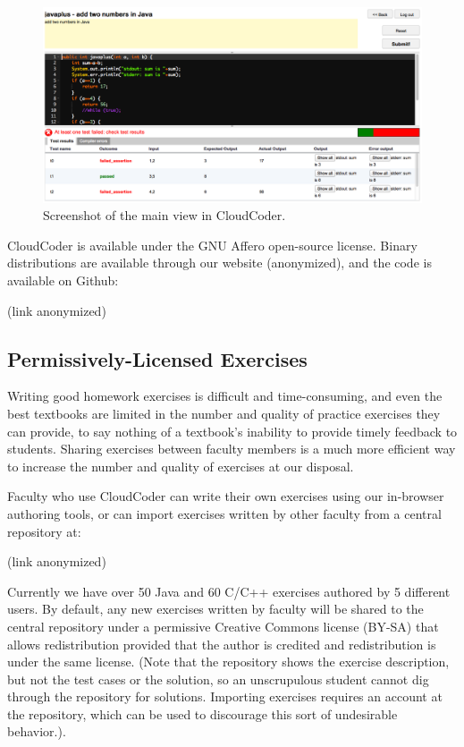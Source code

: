\documentclass{sig-alternate}
\begin{document}
\begin{figure}[ht]
\centering
\includegraphics[width=180mm]{images/screenshot.png}
\caption{Screenshot of the main view in CloudCoder.}
\label{screenshot}
\end{figure}

CloudCoder is available under the GNU Affero open-source license.
Binary distributions are available through our website (anonymized),
and the code is available on Github:

\vspace*{3mm} 
(link anonymized)
\vspace*{3mm}


\subsection{Permissively-Licensed Exercises}

Writing good homework exercises is difficult and
time-consuming, and even the best textbooks are limited in the
number and quality of practice exercises they can provide, to say
nothing of a textbook's inability to provide timely feedback to
students.
Sharing exercises between faculty members is a much
more efficient way to increase the number and quality of exercises at
our disposal.

Faculty who use CloudCoder can write their own exercises using our in-browser
authoring tools, or can import exercises written by other faculty
from a central repository at:

\vspace*{3mm} 
(link anonymized)
\vspace*{3mm} 

Currently we have over 50 Java and 60 C/C++ exercises authored by 5
different users.  By default,
any new exercises written by faculty will be shared to the 
central repository under a permissive Creative Commons license (BY-SA)
that allows redistribution provided that the author is credited and
redistribution is under the same license.  
(Note that the repository shows the exercise description, but not the
test cases or the solution, so an unscrupulous student cannot dig through the
repository for solutions.  Importing exercises requires an account at
the repository, which can be used to discourage this sort of
undesirable behavior.).
\end{document}
